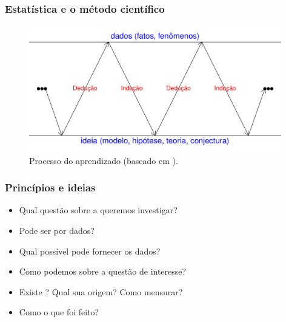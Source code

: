 \documentclass[handout,serif, professionalfont, usenames, dvipsnames, aspectratio = 169]{beamer}\usepackage[]{graphicx}\usepackage[]{color}
\newenvironment{knitrout}{}{} %
\begin{document}
\begin{frame}
  \frametitle{Estatística e o método científico}
\begin{knitrout}
\color{fgcolor}\begin{figure}

{\centering \includegraphics[width=11cm]{figure/unnamed-chunk-3-1} 

}

\caption{Processo do aprendizado (baseado em \cite{box+hunter+hunter:2005}).}\label{fig:unnamed-chunk-3}
\end{figure}


\end{knitrout}
\end{frame}

\begin{frame}
\frametitle{Princípios e ideias}
\begin{itemize}
\item Qual questão sobre a  queremos investigar?
\item Pode ser  por dados?
\item Qual  possível pode fornecer os dados?
\item Como podemos  sobre a questão de interesse?
\item Existe ? Qual sua origem? Como mensurar?
\item Como  o que foi feito? 
\end{itemize}
\end{frame}
\end{document}
